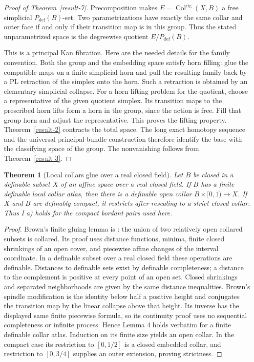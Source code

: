 \documentclass[11pt,a4paper]{article}
\newtheorem{theorem}{Theorem}[section]
\theoremstyle{definition}
\begin{document}
\begin{proof}[Proof of Theorem~\ref{result-7}]
Precomposition makes $E=\operatorname{Col}^{\mathrm{rig}}(X,B)$ a free
simplicial $P_{\mathrm{def}}(B)$-set. Two parametrizations have exactly
the same collar and outer face if and only if their transition map is
in this group. Thus the stated unparametrized space is the degreewise
quotient $E/P_{\mathrm{def}}(B)$.

This is a principal Kan fibration. Here are the needed details for the
family convention. Both the group and the embedding space satisfy horn
filling: glue the compatible maps on a finite simplicial horn and pull
the resulting family back by a PL retraction of the simplex onto the
horn. Such a retraction is obtained by an elementary simplicial collapse.
For a horn lifting problem for the quotient, choose a representative of
the given quotient simplex. Its transition maps to the prescribed horn
lifts form a horn in the group, since the action is free. Fill that
group horn and adjust the representative. This proves the lifting
property. Theorem~\ref{result-2} contracts the total space. The long exact homotopy
sequence and the universal principal-bundle construction therefore
identify the base with the classifying space of the group. The
nonvanishing follows from Theorem~\ref{result-3}.
\end{proof}

\begin{theorem}[Local collars glue over a real closed field]\label{result-8}
Let $B$ be closed in a definable subset $X$ of an affine space over a
real closed field. If $B$ has a finite definable local collar atlas, then
there is a definable open collar $B\times[0,1)\to X$. If $X$ and $B$
are definably compact, it restricts after rescaling to a strict closed
collar. Thus I a) holds for the compact bordant pairs used here.
\end{theorem}
\begin{proof}
Brown's finite gluing lemma is \cite[Lemmas 1--4, pp.~333--337]{Brown1962}:
the union of two relatively open collared subsets is collared. Its proof
uses distance functions, minima, finite closed shrinkings of an open
cover, and piecewise affine changes of the interval coordinate. In a
definable subset over a real closed field these operations are definable.
Distances to definable sets exist by definable completeness; a distance
to the complement is positive at every point of an open set. Closed
shrinkings and separated neighborhoods are given by the same distance
inequalities. Brown's spindle modification is the identity below half
a positive height and conjugates the transition map by the linear
collapse above that height. Its inverse has the displayed same finite
piecewise formula, so its continuity proof uses no sequential
completeness or infinite process. Hence Lemma 4 holds verbatim for a
finite definable collar atlas. Induction on its finite size yields an
open collar. In the compact case its restriction to $[0,1/2]$ is a
closed embedded collar, and restriction to $[0,3/4]$ supplies an outer
extension, proving strictness.
\end{proof}
\end{document}
